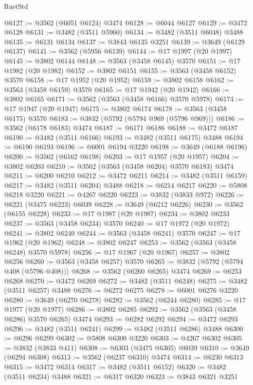 \begin{lexlean}{RustStd}
\begin{coremodule}
@6127 := @3562 (@6051 @6124) @3474
@6128 := @6044 @6127
@6129 := @3472 @6128
@6131 := @3482 (@3511 @5960)
@6134 := @3482 (@3511 @6048) @3488
@6135 := @6131 @6134
@6137 := @3843 @6135 @3251
@6139 := @3649 (@6129 @6137)
@6141 := @3562 (@5956 @6139)
@6144 := @17 @1997 (@20 @1997)
@6145 := @3802 @6144
@6148 := @3563 (@3458 @6145) @3570
@6151 := @17 @1982 (@20 @1982)
@6152 := @3802 @6151
@6155 := @3563 (@3458 @6152) @3570
@6158 := @17 @1952 (@20 @1952)
@6159 := @3802 @6158
@6162 := @3563 (@3458 @6159) @3570
@6165 := @17 @1942 (@20 @1942)
@6166 := @3802 @6165
@6171 := @3562 (@3563 (@3458 @6166) @3570 @5978)
@6174 := @17 @1947 (@20 @1947)
@6175 := @3802 @6174
@6178 := @3563 (@3458 @6175) @3570
@6183 := @3832 (@5792 (@5794 @969 (@5796 @969)))
@6186 := @3562 (@6178 @6183) @3474
@6187 := @6171 @6186
@6188 := @3472 @6187
@6190 := @3482 (@3511 @6166)
@6193 := @3482 (@3511 @6175) @3488
@6194 := @6190 @6193
@6196 := @6001 @6194 @3220
@6198 := @3649 (@6188 @6196)
@6200 := @3562 (@6162 @6198)
@6203 := @17 @1957 (@20 @1957)
@6204 := @3802 @6203
@6210 := @3562 (@3563 (@3458 @6204) @3570 @6183) @3474
@6211 := @6200 @6210
@6212 := @3472 @6211
@6214 := @3482 (@3511 @6159)
@6217 := @3482 (@3511 @6204) @3488
@6218 := @6214 @6217
@6220 := @5808 @6218 @3220
@6221 := @4267 @6220
@6223 := @3832 (@3833 @972)
@6226 := @6221 (@3475 @6223) @6039
@6228 := @3649 (@6212 @6226)
@6230 := @3562 (@6155 @6228)
@6233 := @17 @1987 (@20 @1987)
@6234 := @3802 @6233
@6237 := @3563 (@3458 @6234) @3570
@6240 := @17 @1972 (@20 @1972)
@6241 := @3802 @6240
@6244 := @3563 (@3458 @6241) @3570
@6247 := @17 @1962 (@20 @1962)
@6248 := @3802 @6247
@6253 := @3562 (@3563 (@3458 @6248) @3570 @5978)
@6256 := @17 @1967 (@20 @1967)
@6257 := @3802 @6256
@6260 := @3563 (@3458 @6257) @3570
@6265 := @3832 (@5792 (@5794 @408 (@5796 @408)))
@6268 := @3562 (@6260 @6265) @3474
@6269 := @6253 @6268
@6270 := @3472 @6269
@6272 := @3482 (@3511 @6248)
@6275 := @3482 (@3511 @6257) @3488
@6276 := @6272 @6275
@6278 := @6001 @6276 @3220
@6280 := @3649 (@6270 @6278)
@6282 := @3562 (@6244 @6280)
@6285 := @17 @1977 (@20 @1977)
@6286 := @3802 @6285
@6292 := @3562 (@3563 (@3458 @6286) @3570 @6265) @3474
@6293 := @6282 @6292
@6294 := @3472 @6293
@6296 := @3482 (@3511 @6241)
@6299 := @3482 (@3511 @6286) @3488
@6300 := @6296 @6299
@6302 := @5808 @6300 @3220
@6303 := @4267 @6302
@6305 := @3832 (@3833 @411)
@6308 := @6303 (@3475 @6305) @6039
@6310 := @3649 (@6294 @6308)
@6313 := @3562 (@6237 @6310) @3474
@6314 := @6230 @6313
@6315 := @3472 @6314
@6317 := @3482 (@3511 @6152)
@6320 := @3482 (@3511 @6234) @3488
@6321 := @6317 @6320
@6323 := @3843 @6321 @3251

\end{coremodule}
\end{lexlean}
